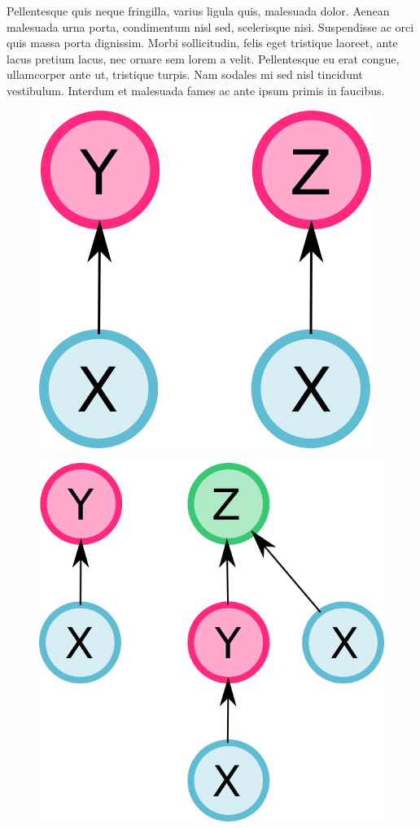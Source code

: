 \documentclass[12pt]{diazessay} %
\begin{document}
Pellentesque quis neque fringilla, varius ligula quis, malesuada dolor. Aenean malesuada urna porta, condimentum nisl sed, scelerisque nisi. Suspendisse ac orci quis massa porta dignissim. Morbi sollicitudin, felis eget tristique laoreet, ante lacus pretium lacus, nec ornare sem lorem a velit. Pellentesque eu erat congue, ullamcorper ante ut, tristique turpis. Nam sodales mi sed nisl tincidunt vestibulum. Interdum et malesuada fames ac ante ipsum primis in faucibus.

\begin{figure}[h]
	\centering
	\includegraphics[scale=0.4]{Figures/ex1input.png}
\end{figure}
\begin{figure}[h]
	\centering
	\includegraphics[scale=0.4]{Figures/ex2input.png}
\end{figure}
\end{document}
